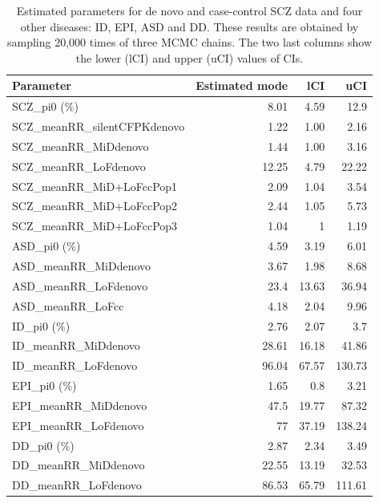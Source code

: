 \documentclass[]{article}
\begin{document}
\begin{table}[H]
\begin{tabular}{l|r|r|r}
\hline
Parameter & Estimated mode & lCI & uCI \\
\hline
SCZ\_pi0 ($\%$) & 8.01 & 4.59  & 12.9 \\
SCZ\_meanRR\_silentCFPKdenovo & 1.22 & 1.00 & 2.16 \\
SCZ\_meanRR\_MiDdenovo & 1.44 & 1.00 & 3.16 \\
SCZ\_meanRR\_LoFdenovo & 12.25 & 4.79 & 22.22 \\
SCZ\_meanRR\_MiD+LoFccPop1 & 2.09 & 1.04 & 3.54 \\
SCZ\_meanRR\_MiD+LoFccPop2 & 2.44 & 1.05 & 5.73 \\
SCZ\_meanRR\_MiD+LoFccPop3 & 1.04 & 1 & 1.19 \\

\hline
ASD\_pi0 ($\%$) & 4.59 & 3.19 & 6.01 \\
ASD\_meanRR\_MiDdenovo & 3.67 & 1.98 & 8.68 \\
ASD\_meanRR\_LoFdenovo & 23.4 & 13.63 & 36.94 \\
ASD\_meanRR\_LoFcc & 4.18 & 2.04 & 9.96 \\
\hline
ID\_pi0 ($\%$) & 2.76 & 2.07 & 3.7 \\
ID\_meanRR\_MiDdenovo & 28.61 & 16.18 & 41.86 \\
ID\_meanRR\_LoFdenovo & 96.04 & 67.57 & 130.73 \\
\hline
EPI\_pi0 ($\%$) & 1.65 & 0.8 & 3.21 \\
EPI\_meanRR\_MiDdenovo & 47.5 & 19.77 & 87.32 \\
EPI\_meanRR\_LoFdenovo & 77 & 37.19 & 138.24 \\
\hline
DD\_pi0 ($\%$) & 2.87 & 2.34 & 3.49 \\
DD\_meanRR\_MiDdenovo & 22.55 & 13.19 & 32.53 \\
DD\_meanRR\_LoFdenovo & 86.53 & 65.79 & 111.61 \\
\hline

\end{tabular}
\caption{Estimated parameters for de novo and case-control SCZ
  data and four other diseases: ID, EPI, ASD and DD. These results are obtained by sampling 20,000
  times of three MCMC chains. The two last columns show the lower (lCI) and upper (uCI) values of CIs.}
\label{tab:sczResults}
\end{table}

\end{document}
